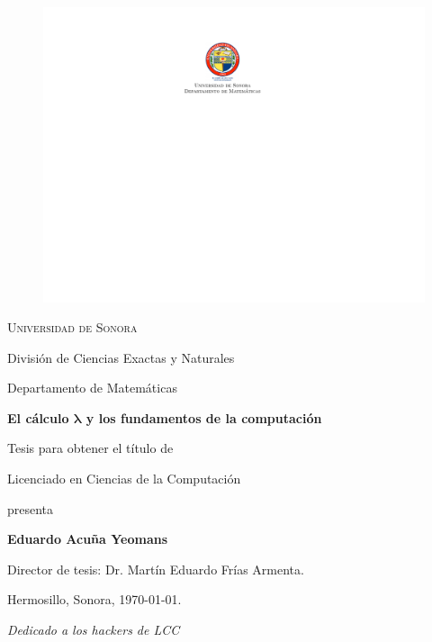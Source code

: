 \documentclass[letterpaper, twoside, openright, 11pt]{book}
\theoremstyle{plain}%
\theoremstyle{definition}
\theoremstyle{remark}
\newcommand{\bs}{\boldsymbol}
\begin{document}
\begin{center}
  \begin{figure}[H]
    \centering
    \includegraphics[width=.2\textwidth]{figuras/escudoUNISON.pdf}
  \end{figure}

  {\Large \textsc{Universidad de Sonora}}

  \vspace{-.1cm}

  División de Ciencias Exactas y Naturales

  \vspace{-.1cm}

  Departamento de Matemáticas

  \vspace{2cm}

  {\bf\Huge El cálculo \( \bs{λ} \) y los fundamentos de la computación}

  \vspace{2cm}

  {\large Tesis para obtener el título de}

  \vspace{.3cm}

  {\LARGE Licenciado en Ciencias de la Computación}

  \vspace{.8cm}

  {\large presenta}

  \vspace{.3cm}

  {\Huge \textbf{Eduardo Acuña Yeomans}}

  \vspace{2cm}
\end{center}

\begin{flushright}
  Director de tesis: Dr. Martín Eduardo Frías Armenta.
  
  Hermosillo, Sonora, \today.
\end{flushright}

\newpage

\newpage

\frontmatter

\cleardoublepage\thispagestyle{empty}
\vspace*{15 cm}
\begin{flushright}\it
  Dedicado a los hackers de LCC
\end{flushright}
\end{document}
